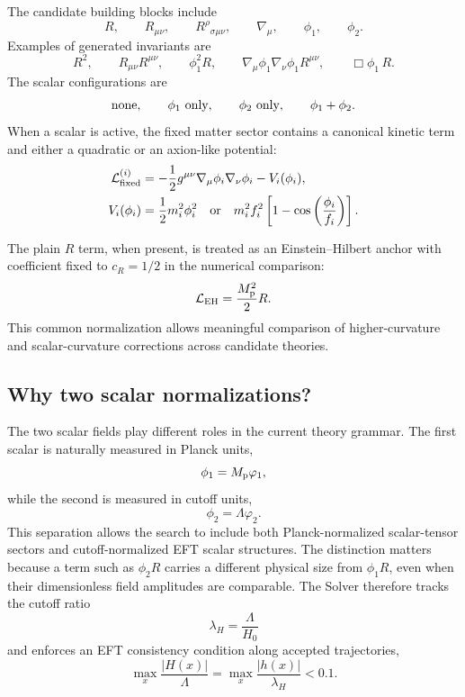 \documentclass[aps,prd,twocolumn,superscriptaddress,nofootinbib,longbibliography]{revtex4-2}
\newcommand{\Lag}{\mathcal{L}}
\newcommand{\Mp}{M_{\rm p}}
\newcommand{\Lam}{\Lambda}
\newcommand{\varphione}{\varphi_1}
\newcommand{\varphitwo}{\varphi_2}
\begin{document}
The candidate building blocks include
\begin{equation}
R,\qquad R_{\mu\nu},\qquad R^\rho{}_{\sigma\mu\nu},\qquad
\nabla_\mu,\qquad \phi_1,\qquad \phi_2 .
\end{equation}
Examples of generated invariants are
\begin{equation}
R^2,\qquad
R_{\mu\nu}R^{\mu\nu},\qquad
\phi_1^2R,\qquad
\nabla_\mu\phi_1\nabla_\nu\phi_1R^{\mu\nu},\qquad
\Box\phi_1\,R .
\end{equation}
The scalar configurations are
\begin{equation}
\hbox{none},\qquad \phi_1\hbox{ only},\qquad \phi_2\hbox{ only},\qquad \phi_1+\phi_2 .
\end{equation}
When a scalar is active, the fixed matter sector contains a canonical kinetic term and either a quadratic or an axion-like potential:
\begin{align}
\Lag_{\rm fixed}^{(i)}
&=-\frac12 g^{\mu\nu}\nabla_\mu\phi_i\nabla_\nu\phi_i - V_i(\phi_i),\\
V_i(\phi_i)
&=\frac12 m_i^2\phi_i^2
\quad{\rm or}\quad
m_i^2f_i^2\left[1-\cos\left(\frac{\phi_i}{f_i}\right)\right].
\label{eq:fixed-sector}
\end{align}

The plain $R$ term, when present, is treated as an Einstein--Hilbert anchor with coefficient fixed to $c_R=1/2$ in the numerical comparison:
\begin{equation}
\Lag_{\rm EH}=\frac{\Mp^2}{2}R.
\label{eq:EH}
\end{equation}
This common normalization allows meaningful comparison of higher-curvature and scalar-curvature corrections across candidate theories.

\subsection{Why two scalar normalizations?}
\label{subsec:two-scalars}

The two scalar fields play different roles in the current theory grammar.  The first scalar is naturally measured in Planck units,
\begin{equation}
\phi_1=\Mp\varphione,
\end{equation}
while the second is measured in cutoff units,
\begin{equation}
\phi_2=\Lam\varphitwo .
\end{equation}
This separation allows the search to include both Planck-normalized scalar-tensor sectors and cutoff-normalized EFT scalar structures.  The distinction matters because a term such as $\phi_2 R$ carries a different physical size from $\phi_1 R$, even when their dimensionless field amplitudes are comparable.  The Solver therefore tracks the cutoff ratio
\begin{equation}
\lambda_H=\frac{\Lam}{H_0}
\end{equation}
and enforces an EFT consistency condition along accepted trajectories,
\begin{equation}
\max_x\frac{|H(x)|}{\Lam}=\max_x\frac{|h(x)|}{\lambda_H}<0.1.
\label{eq:eft-cut}
\end{equation}
\end{document}
